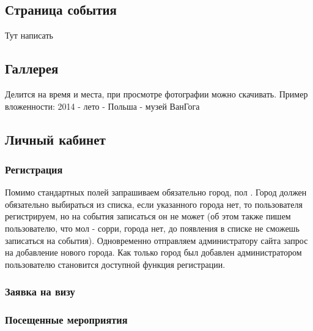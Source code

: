 \documentclass[DIV=calc, paper=a4, fontsize=11pt]{scrartcl} %
\begin{document}
\subsection{Страница события}
Тут написать

\subsection{Галлерея}
Делится на время и места, при просмотре фотографии можно скачивать. Пример вложенности:
2014 - лето - Польша - музей ВанГога

\subsection{Личный кабинет}
\subsubsection{Регистрация}
Помимо стандартных полей запрашиваем обязательно город, пол . 
Город должен обязательно выбираться из списка, если указанного города нет, то пользователя регистрируем, но на события записаться он не может (об этом также пишем пользователю, что мол - сорри, города нет, до появления в списке не сможешь записаться на события). Одновременно отправляем администратору сайта запрос на добавление нового города. Как только город был добавлен администратором пользователю становится доступной функция регистрации.

\subsubsection{Заявка на визу}
\subsubsection{Посещенные мероприятия}

\subsection{}
\end{document}
